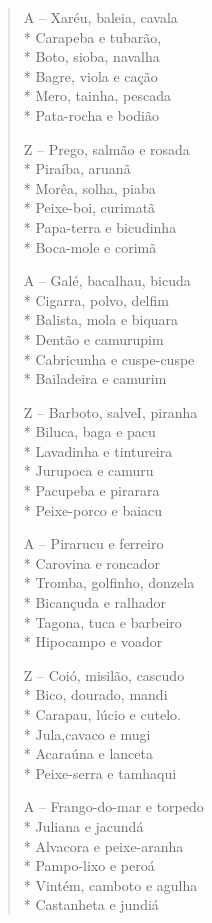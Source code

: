 \begin{verse}
A -- Xaréu, baleia, cavala\\*
Carapeba e tubarão,\\*
Boto, sioba, navalha\\*
Bagre, viola e cação\\*
Mero, tainha, pescada\\*
Pata-rocha e bodião

Z -- Prego, salmão e rosada\\*
Piraíba, aruanã\\*
Morêa, solha, piaba\\*
Peixe-boi, curimatã\\*
Papa-terra e bicudinha\\*
Boca-mole e corimã

A -- Galé, bacalhau, bicuda\\*
Cigarra, polvo, delfim\\*
Balista, mola e biquara\\*
Dentão e camurupim\\*
Cabricunha e cuspe-cuspe\\*
Bailadeira e camurim

Z -- Barboto, salveI, piranha\\*
Biluca, baga e pacu\\*
Lavadinha e tintureira\\*
Jurupoca e camuru\\*
Pacupeba e pirarara\\*
Peixe-porco e baiacu

A -- Pirarucu e ferreiro\\*
Carovina e roncador\\*
Tromba, golfinho, donzela\\*
Bicançuda e ralhador\\*
Tagona, tuca e barbeiro\\*
Hipocampo e voador

Z -- Coió, misilão, cascudo\\*
Bico, dourado, mandi\\*
Carapau, lúcio e cutelo.\\*
Jula,cavaco e mugi\\*
Acaraúna e lanceta\\*
Peixe-serra e tamhaqui

A -- Frango-do-mar e torpedo\\*
Juliana e jacundá\\*
Alvacora e peixe-aranha\\*
Pampo-lixo e peroá\\*
Vintém, camboto e agulha\\*
Castanheta e jundiá


\end{verse}
